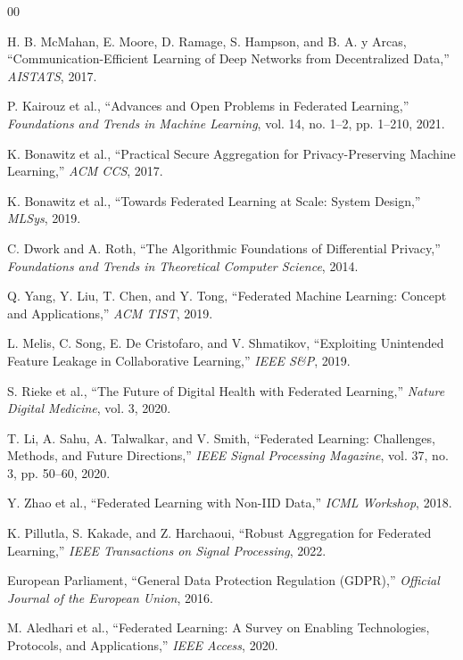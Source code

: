 \documentclass[conference]{IEEEtran}
\begin{document}
\begin{thebibliography}{00}

H. B. McMahan, E. Moore, D. Ramage, S. Hampson, and B. A. y Arcas,
``Communication-Efficient Learning of Deep Networks from Decentralized Data,''
\textit{AISTATS}, 2017.

P. Kairouz et al.,
``Advances and Open Problems in Federated Learning,''
\textit{Foundations and Trends in Machine Learning}, vol. 14, no. 1--2, pp. 1--210, 2021.

K. Bonawitz et al.,
``Practical Secure Aggregation for Privacy-Preserving Machine Learning,''
\textit{ACM CCS}, 2017.

K. Bonawitz et al.,
``Towards Federated Learning at Scale: System Design,''
\textit{MLSys}, 2019.

C. Dwork and A. Roth,
``The Algorithmic Foundations of Differential Privacy,''
\textit{Foundations and Trends in Theoretical Computer Science}, 2014.

Q. Yang, Y. Liu, T. Chen, and Y. Tong,
``Federated Machine Learning: Concept and Applications,''
\textit{ACM TIST}, 2019.

L. Melis, C. Song, E. De Cristofaro, and V. Shmatikov,
``Exploiting Unintended Feature Leakage in Collaborative Learning,''
\textit{IEEE S\&P}, 2019.

S. Rieke et al.,
``The Future of Digital Health with Federated Learning,''
\textit{Nature Digital Medicine}, vol. 3, 2020.

T. Li, A. Sahu, A. Talwalkar, and V. Smith,
``Federated Learning: Challenges, Methods, and Future Directions,''
\textit{IEEE Signal Processing Magazine}, vol. 37, no. 3, pp. 50--60, 2020.

Y. Zhao et al.,
``Federated Learning with Non-IID Data,''
\textit{ICML Workshop}, 2018.

K. Pillutla, S. Kakade, and Z. Harchaoui,
``Robust Aggregation for Federated Learning,''
\textit{IEEE Transactions on Signal Processing}, 2022.

European Parliament,
``General Data Protection Regulation (GDPR),''
\textit{Official Journal of the European Union}, 2016.

M. Aledhari et al.,
``Federated Learning: A Survey on Enabling Technologies, Protocols, and Applications,''
\textit{IEEE Access}, 2020.


\end{thebibliography}
\end{document}
